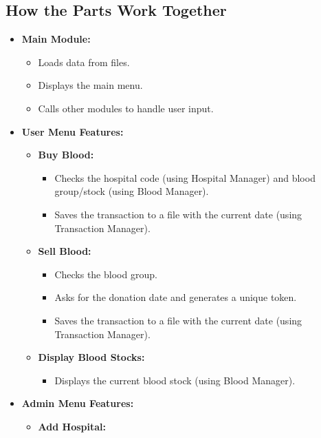 \documentclass[12pt,a4paper]{report}
\begin{document}
\subsection{How the Parts Work Together}
\begin{itemize}
    \item \normalsize \textbf{Main Module:}
    \begin{itemize}
        \item Loads data from files.
        \item Displays the main menu.
        \item Calls other modules to handle user input.
    \end{itemize}
    \item \normalsize \textbf{User Menu Features:}
    \begin{itemize}
        \item \normalsize \textbf{Buy Blood:}
        \begin{itemize}
            \item Checks the hospital code (using Hospital Manager) and blood group/stock (using Blood Manager).
            \item Saves the transaction to a file with the current date (using Transaction Manager).
        \end{itemize}
        \item \normalsize \textbf{Sell Blood:}
        \begin{itemize}
            \item Checks the blood group.
            \item Asks for the donation date and generates a unique token.
            \item Saves the transaction to a file with the current date (using Transaction Manager).
        \end{itemize}
        \item \normalsize \textbf{Display Blood Stocks:}
        \begin{itemize}
            \item Displays the current blood stock (using Blood Manager).
        \end{itemize}
    \end{itemize}
    \item \normalsize \textbf{Admin Menu Features:}
    \begin{itemize}
        \item \normalsize \textbf{Add Hospital:}
        \begin{itemize}

\end{itemize}
\end{itemize}
\end{itemize}
\end{document}
